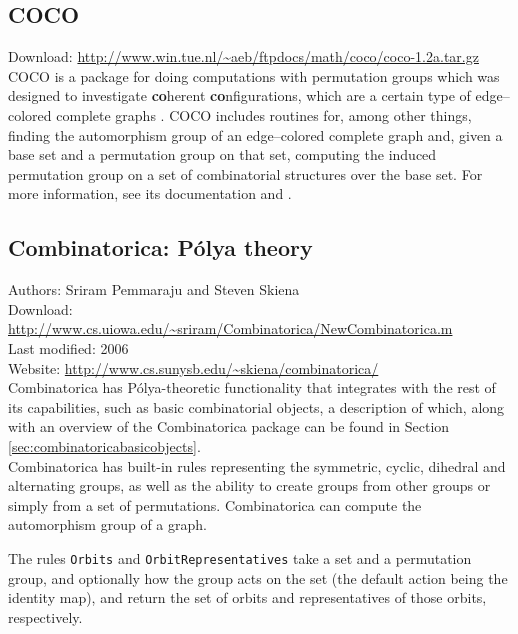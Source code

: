 \documentclass[12pt]{article}
\theoremstyle{plain}
\newcommand{\codefont}[1]{{\fontshape{n}\texttt{#1}}}
\begin{document}
\subsection{COCO}
Download: \url{http://www.win.tue.nl/~aeb/ftpdocs/math/coco/coco-1.2a.tar.gz}
\\

COCO is a package for doing computations with permutation groups which was designed to investigate \textbf{co}herent \textbf{co}nfigurations, which are a certain type of edge--colored complete graphs \cite{cocopaper}.
COCO includes routines for, among other things,
finding the automorphism group of an edge--colored complete graph and,
given a base set and a permutation group on that set,
computing the induced permutation group on a set of combinatorial structures over the base set.
For more information, see its documentation and \cite{cocopaper}.

\subsection{Combinatorica: P\'olya theory}

Authors: Sriram  Pemmaraju and Steven Skiena
\\
Download: \url{http://www.cs.uiowa.edu/~sriram/Combinatorica/NewCombinatorica.m}
\\
Last modified: 2006
\\
Website: \url{http://www.cs.sunysb.edu/~skiena/combinatorica/}
\\

Combinatorica has P\'olya-theoretic functionality that integrates with the rest of its capabilities, such as basic combinatorial objects, a description of which, along with an overview of the Combinatorica package can be found in Section \ref{sec:combinatoricabasicobjects}.\\

Combinatorica has built-in  rules representing the symmetric, cyclic, dihedral and alternating groups, as well as the ability to create groups from other groups or simply from a set of permutations.
Combinatorica can compute the automorphism group of a graph.

The rules \codefont{Orbits} and \codefont{OrbitRepresentatives} take a set and a permutation group, and optionally how the group acts on the set (the default action being the identity map), and return the set of orbits and representatives of those orbits, respectively.
\end{document}
